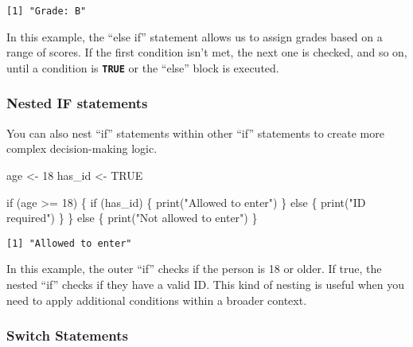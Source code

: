 \documentclass[
  letterpaper,
  DIV=11,
  numbers=noendperiod]{scrartcl}
\newenvironment{Shaded}{\begin{snugshade}}{\end{snugshade}}
\newcommand{\ConstantTok}[1]{\textcolor[rgb]{0.56,0.35,0.01}{#1}}
\newcommand{\ControlFlowTok}[1]{\textcolor[rgb]{0.00,0.23,0.31}{#1}}
\newcommand{\DecValTok}[1]{\textcolor[rgb]{0.68,0.00,0.00}{#1}}
\newcommand{\FunctionTok}[1]{\textcolor[rgb]{0.28,0.35,0.67}{#1}}
\newcommand{\NormalTok}[1]{\textcolor[rgb]{0.00,0.23,0.31}{#1}}
\newcommand{\OtherTok}[1]{\textcolor[rgb]{0.00,0.23,0.31}{#1}}
\newcommand{\SpecialCharTok}[1]{\textcolor[rgb]{0.37,0.37,0.37}{#1}}
\newcommand{\StringTok}[1]{\textcolor[rgb]{0.13,0.47,0.30}{#1}}
\begin{document}
\begin{verbatim}
[1] "Grade: B"
\end{verbatim}

In this example, the ``else if'' statement allows us to assign grades
based on a range of scores. If the first condition isn't met, the next
one is checked, and so on, until a condition is \textbf{\texttt{TRUE}}
or the ``else'' block is executed.

\hypertarget{nested-if-statements}{%
\subsubsection{Nested IF statements}\label{nested-if-statements}}

You can also nest ``if'' statements within other ``if'' statements to
create more complex decision-making logic.

\begin{Shaded}
\begin{Highlighting}[]
\NormalTok{age }\OtherTok{\textless{}{-}} \DecValTok{18}
\NormalTok{has\_id }\OtherTok{\textless{}{-}} \ConstantTok{TRUE}

\ControlFlowTok{if}\NormalTok{ (age }\SpecialCharTok{\textgreater{}=} \DecValTok{18}\NormalTok{) \{}
  \ControlFlowTok{if}\NormalTok{ (has\_id) \{}
    \FunctionTok{print}\NormalTok{(}\StringTok{"Allowed to enter"}\NormalTok{)}
\NormalTok{  \} }\ControlFlowTok{else}\NormalTok{ \{}
    \FunctionTok{print}\NormalTok{(}\StringTok{"ID required"}\NormalTok{)}
\NormalTok{  \}}
\NormalTok{\} }\ControlFlowTok{else}\NormalTok{ \{}
  \FunctionTok{print}\NormalTok{(}\StringTok{"Not allowed to enter"}\NormalTok{)}
\NormalTok{\}}
\end{Highlighting}
\end{Shaded}

\begin{verbatim}
[1] "Allowed to enter"
\end{verbatim}

In this example, the outer ``if'' checks if the person is 18 or older.
If true, the nested ``if'' checks if they have a valid ID. This kind of
nesting is useful when you need to apply additional conditions within a
broader context.

\hypertarget{switch-statements}{%
\subsubsection{Switch Statements}\label{switch-statements}}
\end{document}
